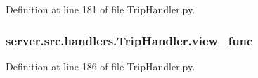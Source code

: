 Definition at line 181 of file Trip\+Handler.\+py.

\subsubsection[{\texorpdfstring{view\+\_\+func}{view_func}}]{\setlength{\rightskip}{0pt plus 5cm}server.\+src.\+handlers.\+Trip\+Handler.\+view\+\_\+func}\hypertarget{namespaceserver_1_1src_1_1handlers_1_1_trip_handler_a8c3e5f11f192c958732933ef2cd9ff89}{}\label{namespaceserver_1_1src_1_1handlers_1_1_trip_handler_a8c3e5f11f192c958732933ef2cd9ff89}


Definition at line 186 of file Trip\+Handler.\+py.

